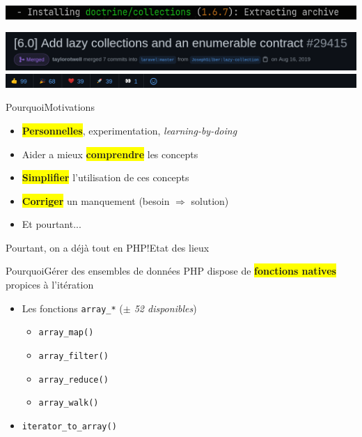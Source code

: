 \begin{frame}
    \includegraphics[width=\textwidth]{screenshots/Screenshot_20210520_104535.png}
\end{frame}

\begin{frame}
    \includegraphics[width=\textwidth]{screenshots/Screenshot_20210520_101402.png}
    \includegraphics[width=\textwidth]{screenshots/Screenshot_20210520_101458.png}
\end{frame}

\begin{frame}{Pourquoi}{Motivations}
    \begin{itemize}[<+->]
        \item \colorbox{yellow}{\textbf{Personnelles}}, experimentation, \textit{learning-by-doing}
        \item Aider a mieux \colorbox{yellow}{\textbf{comprendre}} les concepts
        \item \colorbox{yellow}{\textbf{Simplifier}} l'utilisation de ces concepts
        \item \colorbox{yellow}{\textbf{Corriger}} un manquement (besoin $\Rightarrow$ solution)
        \item Et pourtant...
    \end{itemize}
\end{frame}

\begin{frameC}{Pourtant, on a déjà tout en PHP!}{Etat des lieux}

\end{frameC}

\begin{frame}{Pourquoi}{Gérer des ensembles de données}
    PHP dispose de \colorbox{yellow}{\textbf{fonctions natives}} propices à l'itération

    \pause

    \begin{itemize}[<+->]
        \item Les fonctions \texttt{array\_*} (\textit{$\pm$ 52 disponibles})
        \begin{itemize}[<+->]
            \item \texttt{array\_map()}
            \item \texttt{array\_filter()}
            \item \texttt{array\_reduce()}
            \item \texttt{array\_walk()}
        \end{itemize}
    \item \texttt{iterator\_to\_array()}
    \end{itemize}
\end{frame}

